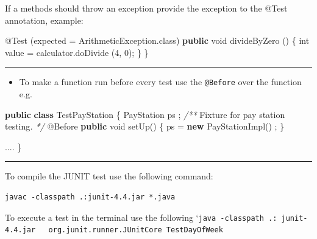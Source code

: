 \documentclass[11pt]{article}
\providecommand{\tightlist}{%
      \setlength{\itemsep}{0pt}\setlength{\parskip}{0pt}}
\newenvironment{Shaded}{}{}
\newcommand{\KeywordTok}[1]{\textcolor[rgb]{0.00,0.44,0.13}{\textbf{{#1}}}}
\newcommand{\DataTypeTok}[1]{\textcolor[rgb]{0.56,0.13,0.00}{{#1}}}
\newcommand{\DecValTok}[1]{\textcolor[rgb]{0.25,0.63,0.44}{{#1}}}
\newcommand{\CommentTok}[1]{\textcolor[rgb]{0.38,0.63,0.69}{\textit{{#1}}}}
\newcommand{\FunctionTok}[1]{\textcolor[rgb]{0.02,0.16,0.49}{{#1}}}
\newcommand{\NormalTok}[1]{{#1}}
\newcommand{\BuiltInTok}[1]{{#1}}
\newcommand{\AttributeTok}[1]{\textcolor[rgb]{0.49,0.56,0.16}{{#1}}}
\begin{document}
If a methods should throw an exception provide the exception to the
@Test annotation, example:

\begin{Shaded}
\begin{Highlighting}[]
\AttributeTok{@Test}\NormalTok{ (expected = }\BuiltInTok{ArithmeticException}\NormalTok{.}\FunctionTok{class}\NormalTok{) }
    \KeywordTok{public} \DataTypeTok{void} \FunctionTok{divideByZero}\NormalTok{ () \{}
        \DataTypeTok{int}\NormalTok{ value = calculator.}\FunctionTok{doDivide}\NormalTok{ (}\DecValTok{4}\NormalTok{, }\DecValTok{0}\NormalTok{); }
\NormalTok{    \}}
\NormalTok{\}}
\end{Highlighting}
\end{Shaded}

\begin{center}\rule{0.5\linewidth}{\linethickness}\end{center}

\begin{itemize}
\tightlist
\item
  To make a function run before every test use the \texttt{@Before} over
  the function e.g.
\end{itemize}

\begin{Shaded}
\begin{Highlighting}[]
\KeywordTok{public} \KeywordTok{class}\NormalTok{ TestPayStation \{}
\NormalTok{    PayStation ps ;}
    \CommentTok{/**}\NormalTok{ Fixture for pay station testing}\CommentTok{. */} 
    \AttributeTok{@Before}
    \KeywordTok{public} \DataTypeTok{void} \FunctionTok{setUp}\NormalTok{() \{}
\NormalTok{        ps = }\KeywordTok{new} \FunctionTok{PayStationImpl}\NormalTok{() ; }
\NormalTok{    \}}
        
\NormalTok{....}
\NormalTok{\}}
\end{Highlighting}
\end{Shaded}

\begin{center}\rule{0.5\linewidth}{\linethickness}\end{center}

To compile the JUNIT test use the following command:

\begin{verbatim}
javac -classpath .:junit-4.4.jar *.java
\end{verbatim}

To execute a test in the terminal use the following
`\texttt{java\ -classpath\ .:\ junit-4.4.jar\ \ \ org.junit.runner.JUnitCore\ TestDayOfWeek}
\end{document}
